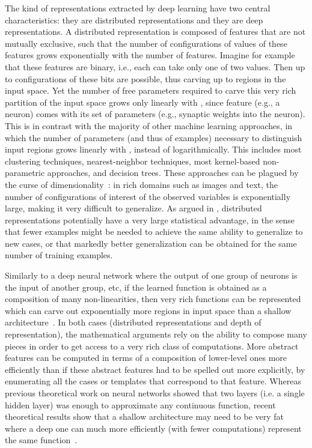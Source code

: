 \documentclass[11pt]{article} %
\begin{document}
The kind of representations extracted by deep learning have two central
characteristics: they are distributed representations and they are deep
representations. A distributed representation is composed of features that
are not mutually exclusive, such that the number of configurations of
values of these features grows exponentially with the number of
features. Imagine for example that these features are binary, i.e., each
can take only one of two values. Then up to configurations of these bits
are possible, thus carving up to regions in the input space. Yet the number
of free parameters required to carve this very rich partition of the input
space grows only linearly with , since feature (e.g., a neuron) comes with
its set of parameters (e.g., synaptic weights into the neuron). This is in
contrast with the majority of other machine learning approaches, in which
the number of parameters (and thus of examples) necessary to distinguish
input regions grows linearly with , instead of logarithmically. This
includes most clustering techniques, nearest-neighbor techniques, most
kernel-based non-parametric approaches, and decision trees. These
approaches can be plagued by the curse of
dimensionality~\citep{Bengio-localfailure-NIPS-2006-small,Bengio-decision-trees10}:
in rich domains such as images and text, the number of configurations of
interest of the observed variables is exponentially large, making it very
difficult to generalize. As argued in \citet{Bengio-book, Montufar+Morton-2014, Montufar-et-al-NIPS2014},
distributed representations potentially have a very large
statistical advantage, in the sense that fewer examples might be needed to
achieve the same ability to generalize to new cases, or that markedly
better generalization can be obtained for the same number of training
examples.


Similarly to a deep neural network where the output of one group of neurons
is the input of another group, etc, if the learned function is obtained as
a composition of many non-linearities, then very rich functions can be
represented which can carve out exponentially more regions in input space
than a shallow architecture~\citep{Montufar-et-al-NIPS2014}. In both cases (distributed
representations and depth of representation), the mathematical arguments
rely on the ability to compose many pieces in order to get access to a very
rich class of computations. More abstract features can be computed in terms
of a composition of lower-level ones more efficiently than if these
abstract features had to be spelled out more explicitly, by enumerating all
the cases or templates that correspond to that feature. Whereas previous
theoretical work on neural networks showed that two layers (i.e. a single
hidden layer) was enough to approximate any continuous function, recent
theoretical results show that a shallow architecture may need to be very
fat where a deep one can much more efficiently (with fewer computations)
represent the same function~\citep{Bengio+Delalleau-ALT-2011-small,Montufar-et-al-NIPS2014}.
\end{document}
